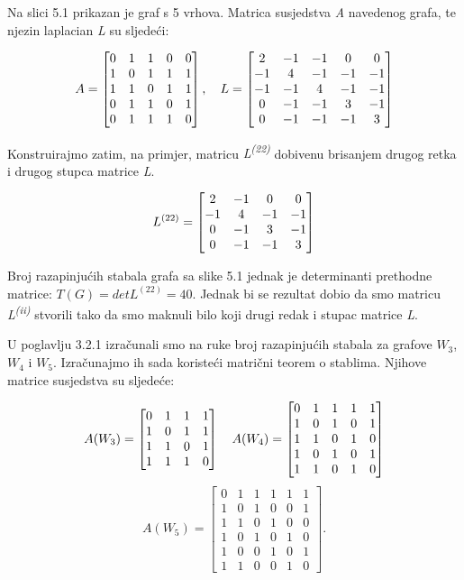 \documentclass[times, utf8, zavrsni]{fer}
\begin{document}
Na slici 5.1 prikazan je graf s 5 vrhova. Matrica susjedstva \textit{A} navedenog grafa, te njezin laplacian \textit{L} su sljedeći:

\[
\centering
A = 
\begin{bmatrix}
	0 & 1 & 1 & 0 & 0 \\
	1 & 0 & 1 & 1 & 1 \\
	1 & 1 & 0 & 1 & 1 \\
	0 & 1 & 1 & 0 & 1 \\
	0 & 1 & 1 & 1 & 0
\end{bmatrix}
, \quad
L = 
\begin{bmatrix}
	2 & -1 & -1 & 0 & 0 \\
	-1 & 4 & -1 & -1 & -1 \\
	-1 & -1 & 4 & -1 & -1 \\
	0 & -1 & -1 & 3 & -1 \\
	0 & -1 & -1 & -1 & 3
\end{bmatrix}
\]

Konstruirajmo zatim, na primjer, matricu \textit{L\textsuperscript{(22)}} dobivenu brisanjem drugog retka i drugog stupca matrice \textit{L}.

\[
\centering
L^{(22)} = 
\begin{bmatrix}
	2 & -1 & 0 & 0 \\
	-1 & 4 & -1 & -1 \\
	0 & -1 & 3 & -1 \\
	0 & -1 & -1 & 3
\end{bmatrix}
\]

Broj razapinjućih stabala grafa sa slike 5.1 jednak je determinanti prethodne matrice: $T(G) = det L^{(22)} = 40$. Jednak bi se rezultat dobio da smo matricu \textit{L\textsuperscript{(ii)}} stvorili tako da smo maknuli bilo koji drugi redak i stupac matrice \textit{L}.

U poglavlju 3.2.1 izračunali smo na ruke broj razapinjućih stabala za grafove $W_3$, $W_4$ i $W_5$. Izračunajmo ih sada koristeći matrični teorem o stablima. Njihove matrice susjedstva su sljedeće:

\[
\centering
A(W_3) = 
\begin{bmatrix}
	0 & 1 & 1 & 1 \\
	1 & 0 & 1 & 1 \\
	1 & 1 & 0 & 1 \\
	1 & 1 & 1 & 0
\end{bmatrix}
\quad
A(W_4) =
\begin{bmatrix}
	0 & 1 & 1 & 1 & 1 \\
	1 & 0 & 1 & 0 & 1\\
	1 & 1 & 0 & 1 & 0 \\
	1 & 0 & 1 & 0 & 1 \\
	1 & 1 & 0 & 1 & 0
\end{bmatrix}
\]
\[
A(W_5) =
\begin{bmatrix}
	0 & 1 & 1 & 1 & 1 & 1 \\
	1 & 0 & 1 & 0 & 0 & 1 \\
	1 & 1 & 0 & 1 & 0 & 0 \\
	1 & 0 & 1 & 0 & 1 & 0 \\
	1 & 0 & 0 & 1 & 0 & 1 \\
	1 & 1 & 0 & 0 & 1 & 0
\end{bmatrix}.
\]
\end{document}
